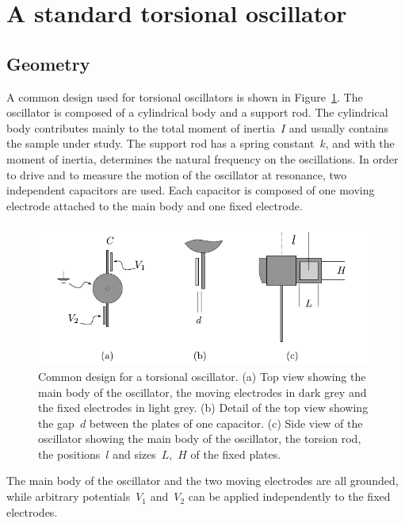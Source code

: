



\section{A standard torsional oscillator}

\subsection{Geometry}
\label{sec.standard}
A common design used for torsional oscillators is shown in Figure~\ref{fig.StandardDesign}.
The oscillator is composed of a cylindrical body and a support rod. The cylindrical body contributes mainly to the total moment of inertia~$I$ and usually contains the sample under study. The support rod has a spring constant~$k$, and with the moment of inertia, determines the natural frequency on the oscillations. In order to drive and to measure the motion of the oscillator at resonance, two independent capacitors are used. Each capacitor is composed of one moving electrode attached to the main body and one fixed electrode.
\begin{figure}[htb]
	\captionsetup{width=.8\linewidth}
	\centering
	\includegraphics[width=12cm]{StandardDesign}
	\caption{ \small Common design for a torsional oscillator.
		(a) Top view showing the main body of the oscillator, the moving electrodes in dark grey and the fixed electrodes in light grey. (b) Detail of the top view showing the gap~$d$ between the plates of one capacitor. (c) Side view of the oscillator showing the main body of the oscillator, the torsion rod, the positions~$l$ and sizes~$L$,~$H$ of the fixed plates.}
	\label{fig.StandardDesign}
\end{figure}
The main body of the oscillator and the two moving electrodes are all grounded, while arbitrary potentials~$V_1$ and~$V_2$ can be applied independently to the fixed electrodes.

